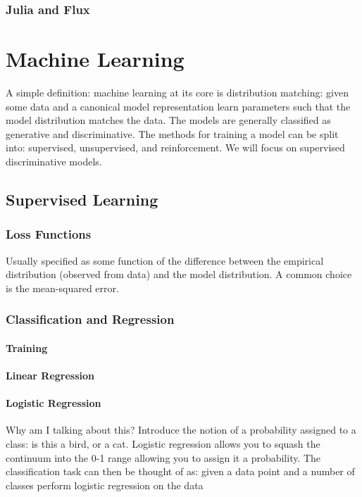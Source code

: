 \documentclass[12pt]{book}
\begin{document}
\subsection{Julia and Flux}

\chapter{Machine Learning}
A simple definition: machine learning at its core is distribution matching: given some data and a canonical model representation learn parameters such that the model distribution matches the data. The models are generally classified as generative and discriminative. The methods for training a model can be split into: supervised, unsupervised, and reinforcement. We will focus on supervised discriminative models. 

\section{Supervised Learning}

\subsection{Loss Functions}
Usually specified as some function of the difference between the empirical distribution (observed from data) and the model distribution. A common choice is the mean-squared error. 

\subsection{Classification and Regression}

\subsubsection{Training}

\subsubsection{Linear Regression}

\subsubsection{Logistic Regression}

Why am I talking about this? Introduce the notion of a probability assigned to a class: is this a bird, or a cat. Logistic regression allows you to squash the continuum into the 0-1 range allowing you to assign it a probability. The classification task can then be thought of as: given a data point and a number of classes perform logistic regression on the data 
\end{document}
